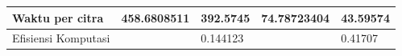 \begin{table}[H]
\begin{small}
\begin{tabular}{|l|l|l|l|l|}
Waktu per citra                                   & 458.6808511                                                                                                        & 392.5745                                                                                                                             & 74.78723404                                                                                                        & 43.59574                                                                                                                                       \\ \hline
Efisiensi Komputasi                               &                                                                                                                    & 0.144123                                                                                                                             &                                                                                                                    & 0.41707                                                                                                                                        \\ \cline{1-1} \cline{3-3} \cline{5-5} 
\end{tabular}
\end{small}
\end{table}

\newpage